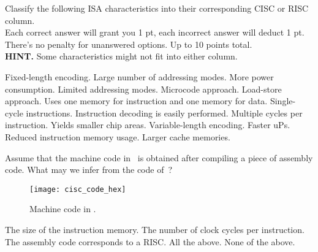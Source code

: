 \documentclass[number=3]{examfancy}
\newif\ifanswers
\begin{document}
\begin{questions}
\newpage
\question[10] Classify the following \acs{ISA} characteristics into their corresponding \acs{CISC} or \acs{RISC} column.\\
Each correct answer will grant you 1 pt, each incorrect answer will deduct 1 pt. There's no penalty for unanswered options. Up to 10 points total.
\\
\textbf{HINT.} Some characteristics might not fit into either column.
\begin{choices}
\choice Fixed-length encoding.\label{choice:risc_1}
\choice Large number of addressing modes.\label{choice:cisc_1}
\choice More power consumption.\label{choice:incorrect_1}
\choice Limited addressing modes.\label{choice:risc_2}
\choice Microcode approach.\label{choice:cisc_2}
\choice Load-store approach.\label{choice:risc_3}
\choice Uses one memory for instruction and one memory for data.\label{choice:incorrect_2}
\choice Single-cycle instructions.\label{choice:risc_4}
\choice Instruction decoding is easily performed.\label{choice:risc_5}
\choice Multiple cycles per instruction.\label{choice:cisc_3}
\choice Yields smaller chip areas.\label{choice:incorrect_3}
\choice Variable-length encoding.\label{choice:cisc_4}
\choice Faster \acsp{uP}.\label{choice:incorrect_4}
\choice Reduced instruction memory usage.\label{choice:cisc_5}
\choice Larger cache memories.\label{choice:incorrect_5}
\end{choices}
\ifanswers

\else

\fi


\newpage
\question[3] Assume that the machine code in~ is obtained after compiling a piece of assembly code. What may we infer from the code of~?
\begin{figure}[!ht]
\centering
\texttt{[image: cisc\_code\_hex]}
\caption{Machine code in .}
\label{figure:cisc_code_hex}
\end{figure}
\begin{choices}
\choice The size of the instruction memory.
\choice The number of clock cycles per instruction.
\choice The assembly code corresponds to a \acs{RISC}.
\choice All the above.
\CorrectChoice None of the above.
\end{choices}


\end{questions}
\end{document}
